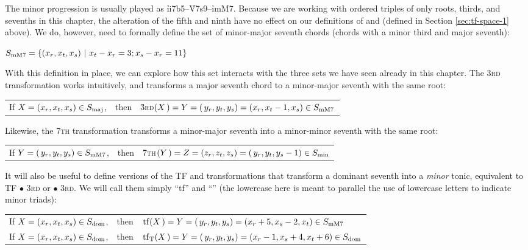 The minor \tfmo progression is usually played as
\mbox{\h{ii7b5}--\h{V7s9}--\h{i\thinspace{}mM7}}. Because
we are working with ordered triples of only roots, thirds, and sevenths in
this chapter, the alteration of the fifth and ninth have no effect on our
definitions of \Smin and \Sdom (defined in Section \ref{sec:tf-space-1}
above). We do, however, need to formally define the set of minor-major seventh
chords (chords with a minor third and major seventh):

\vspace{.5\baselineskip}
  $S_{\mathrm{mM7}} = \{ (x_r, x_t, x_s)\ |\ x_t - x_r = 3; x_s - x_r = 11 \}$
\vspace{.5\baselineskip}

With this definition in place, we can explore how this set interacts with the
three sets we have seen already in this chapter. The \textsc{3rd}
transformation works intuitively, and transforms a major seventh chord to a
minor-major seventh with the same root:

\vspace{.5\baselineskip}
\begin{tabular}{lcl}
  If $X = (x_r, x_t, x_s) \in S_{\mathrm{maj}}$, & then &
     \h{3}\textsc{rd}$(X\,) = Y = (\,y_r, y_t, y_s)=(x_r, x_t-1, x_s) \in S_{\mathrm{mM7}}$
\end{tabular}
\vspace{.5\baselineskip}

\noindent Likewise, the \textsc{7th} transformation transforms a
minor-major seventh into a minor-minor seventh with the same root:

\vspace{.5\baselineskip}
\begin{tabular}{lcl}
  If $Y = (\,y_r, y_t, y_s) \in S_{\mathrm{mM7}}$, & then &
    \h{7}\textsc{th}$(Y\,) = Z = (z_r, z_t, z_s)=(\,y_r, y_t, y_s-1) \in S_{\mathrm{min}}$
\end{tabular}
\vspace{.5\baselineskip}

\noindent It will also be useful to define versions of the TF and \tft
transformations that transform a dominant seventh into a \emph{minor} tonic,
equivalent to TF $\bullet$ \textsc{3rd} or \tft $\bullet$ \textsc{3rd}. We will
call them simply ``tf'' and ``\tfmt'' (the lowercase here is meant to parallel
the use of lowercase letters to indicate minor triads): \\
%
\vspace{0.5\baselineskip}
\begin{tabular}{lcl}
  If $X = (x_r, x_t, x_s) \in S_{\mathrm{dom}}$, & then &
    $\mathrm{tf}(X\,) = Y = (\,y_r, y_t, y_s) = (x_r + 5, x_s - 2, x_t) \in S_{\mathrm{mM7}}$ \\
%
  If $X = (x_r, x_t, x_s) \in S_{\mathrm{dom}}$, & then &
    $\mathrm{tf}_\mathrm{T}(X\,) = Y = (\,y_r, y_t, y_s) = (x_r - 1, x_s + 4,
                                               x_t + 6) \in S_{\mathrm{dom}}$ \\
\end{tabular}
\vspace{0.5\baselineskip}

